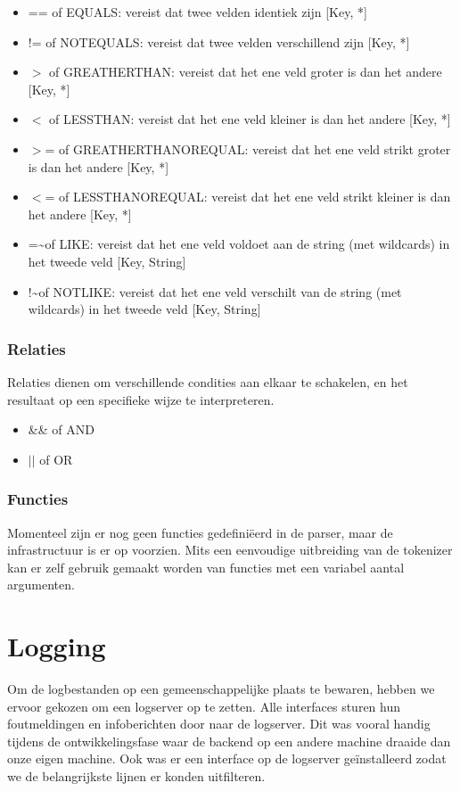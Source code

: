 \begin{itemize}
\item == of EQUALS: vereist dat twee velden identiek zijn [Key, *]
\item != of NOTEQUALS: vereist dat twee velden verschillend zijn [Key, *]
\item $>$ of GREATHERTHAN: vereist dat het ene veld groter is dan het andere [Key, *]
\item $<$ of LESSTHAN: vereist dat het ene veld kleiner is dan het andere [Key, *]
\item $>$= of GREATHERTHANOREQUAL: vereist dat het ene veld strikt groter is dan het andere [Key, *]
\item $<$= of LESSTHANOREQUAL: vereist dat het ene veld strikt kleiner is dan het andere [Key, *]
\item =\textasciitilde of LIKE: vereist dat het ene veld voldoet aan de string (met wildcards) in het tweede veld [Key, String]
\item !\textasciitilde of NOTLIKE: vereist dat het ene veld verschilt van de string (met wildcards) in het tweede veld [Key, String]
\end{itemize}

\subsection{Relaties}

Relaties dienen om verschillende condities aan elkaar te schakelen, en het resultaat op een specifieke wijze te interpreteren.

\begin{itemize}
\item \&\& of AND
\item $||$ of OR
\end{itemize}

\subsection{Functies}

Momenteel zijn er nog geen functies gedefini\"eerd in de parser, maar de infrastructuur is er op voorzien. Mits een eenvoudige uitbreiding van de tokenizer kan er zelf gebruik gemaakt worden van functies met een variabel aantal argumenten.

%
%

\chapter{Logging}

Om de logbestanden op een gemeenschappelijke plaats te bewaren, hebben we ervoor gekozen om een logserver op te zetten. Alle interfaces sturen hun foutmeldingen en infoberichten door naar de logserver. Dit was vooral handig tijdens de ontwikkelingsfase waar de backend op een andere machine draaide dan onze eigen machine. Ook was er een interface op de logserver ge\"installeerd zodat we de belangrijkste lijnen er konden uitfilteren.
